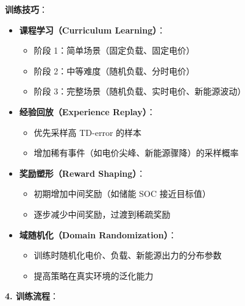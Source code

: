 \documentclass[12pt,a4paper]{article}
\begin{document}
\textbf{训练技巧}：

\begin{itemize}
    \item \textbf{课程学习（Curriculum Learning）}：
    \begin{itemize}
        \item 阶段 1：简单场景（固定负载、固定电价）
        \item 阶段 2：中等难度（随机负载、分时电价）
        \item 阶段 3：完整场景（随机负载、实时电价、新能源波动）
    \end{itemize}
    
    \item \textbf{经验回放（Experience Replay）}：
    \begin{itemize}
        \item 优先采样高 TD-error 的样本
        \item 增加稀有事件（如电价尖峰、新能源骤降）的采样概率
    \end{itemize}
    
    \item \textbf{奖励塑形（Reward Shaping）}：
    \begin{itemize}
        \item 初期增加中间奖励（如储能 SOC 接近目标值）
        \item 逐步减少中间奖励，过渡到稀疏奖励
    \end{itemize}
    
    \item \textbf{域随机化（Domain Randomization）}：
    \begin{itemize}
        \item 训练时随机化电价、负载、新能源出力的分布参数
        \item 提高策略在真实环境的泛化能力
    \end{itemize}
\end{itemize}

\textbf{4. 训练流程}：
\end{document}
